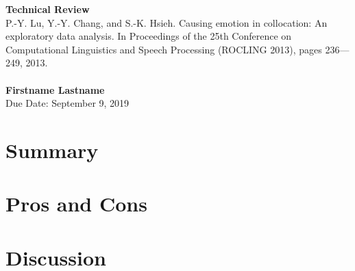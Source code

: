\documentclass[11pt]{article}
\begin{document}

\noindent
\large\textbf{Technical Review} \\  
\normalsize P.-Y. Lu, Y.-Y. Chang, and S.-K. Hsieh.  Causing emotion in collocation:  An exploratory data analysis. In Proceedings of the 25th Conference on Computational Linguistics and Speech Processing (ROCLING 2013), pages 236---249, 2013.
\\ \\
\textbf{Firstname Lastname} \\
\normalsize   Due Date: September 9, 2019

\section*{Summary}
\lipsum[1] %

\section*{Pros and Cons}
\lipsum[2] %

\section*{Discussion}
\lipsum[3] %
\end{document}
